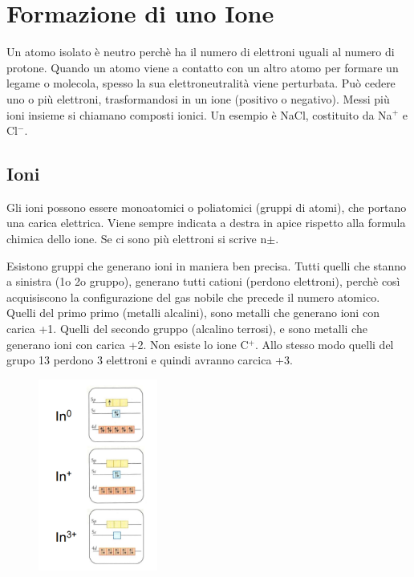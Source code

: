 \documentclass[a4paper]{article}
\begin{document}
\section{Formazione di uno Ione}
Un atomo isolato è neutro perchè ha il numero di elettroni uguali al numero di protone. Quando un atomo viene a contatto con un altro atomo per formare un legame o molecola, spesso la sua elettroneutralità viene perturbata. Può cedere uno o più elettroni, trasformandosi in un ione (positivo o negativo). Messi più ioni insieme si chiamano composti ionici. Un esempio è NaCl, costituito da Na$^+$ e Cl$^-$. 

\subsection{Ioni}
Gli ioni possono essere monoatomici o poliatomici (gruppi di atomi), che portano una carica elettrica. Viene sempre indicata a destra in apice rispetto alla formula chimica dello ione. Se ci sono più elettroni si scrive n$\pm$. 

Esistono gruppi che generano ioni in maniera ben precisa. Tutti quelli che stanno a sinistra (1o 2o gruppo), generano tutti cationi (perdono elettroni), perchè così acquisiscono la configurazione del gas nobile che precede il numero atomico. Quelli del primo primo (metalli alcalini), sono metalli che generano ioni con carica +1. Quelli del secondo gruppo (alcalino terrosi), e sono metalli che generano ioni con carica +2. Non esiste lo ione C$^+$. Allo stesso modo quelli del grupo 13 perdono 3 elettroni e quindi avranno carcica +3. 

\begin{figure}
    \begin{center}
    \includegraphics[width=0.35\textwidth]{indio_ione.png}
    \end{center}
\end{figure}
\FloatBarrier
\end{document}
